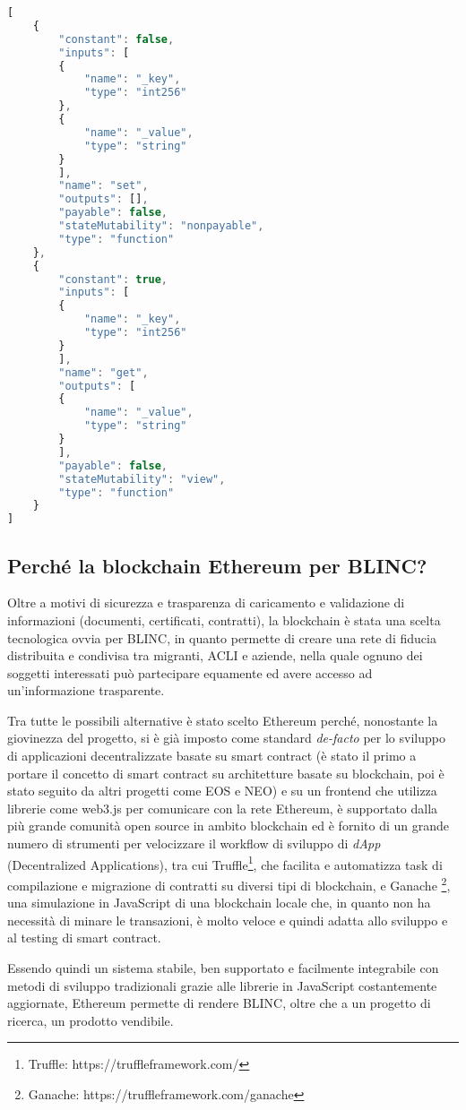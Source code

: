 \begin{lstlisting}[language=JavaScript, numbers=none]
[
    {
        "constant": false,
        "inputs": [
        {
            "name": "_key",
            "type": "int256"
        },
        {
            "name": "_value",
            "type": "string"
        }
        ],
        "name": "set",
        "outputs": [],
        "payable": false,
        "stateMutability": "nonpayable",
        "type": "function"
    },
    {
        "constant": true,
        "inputs": [
        {
            "name": "_key",
            "type": "int256"
        }
        ],
        "name": "get",
        "outputs": [
        {
            "name": "_value",
            "type": "string"
        }
        ],
        "payable": false,
        "stateMutability": "view",
        "type": "function"
    }
]
\end{lstlisting}

\subsection{Perché la blockchain Ethereum per BLINC?}

Oltre a motivi di sicurezza e trasparenza di caricamento e validazione di informazioni
(documenti, certificati, contratti), la blockchain è stata una scelta tecnologica ovvia
per BLINC, in quanto permette di creare una rete di fiducia distribuita e condivisa tra migranti, ACLI e aziende,
nella quale ognuno dei soggetti interessati può partecipare equamente ed avere accesso ad un'informazione trasparente.

Tra tutte le possibili alternative è stato scelto Ethereum perché, nonostante la giovinezza
del progetto, si è già imposto come standard \emph{de-facto}
per lo sviluppo di applicazioni decentralizzate basate su smart contract
(è stato il primo a portare il concetto di smart contract su architetture
basate su blockchain, poi è stato seguito da altri progetti come EOS e NEO)
e su un frontend che utilizza librerie come web3.js per comunicare con la rete Ethereum,
è supportato dalla più grande comunità open source in ambito blockchain ed è fornito di
un grande numero di strumenti per velocizzare il workflow di sviluppo di \emph{dApp}
(Decentralized Applications), tra cui Truffle\footnote{Truffle: https://truffleframework.com/}, che facilita e
automatizza task di compilazione e migrazione di contratti su diversi tipi di blockchain, e Ganache
\footnote{Ganache: https://truffleframework.com/ganache}, una simulazione in
JavaScript di una blockchain locale che, in quanto non ha necessità di minare le
transazioni, è molto veloce e quindi adatta allo sviluppo e al testing di smart contract.

Essendo quindi un sistema stabile, ben supportato e facilmente integrabile con metodi di sviluppo 
tradizionali grazie alle librerie in JavaScript costantemente aggiornate, 
Ethereum permette di rendere BLINC, oltre che a un progetto di ricerca, un prodotto vendibile.